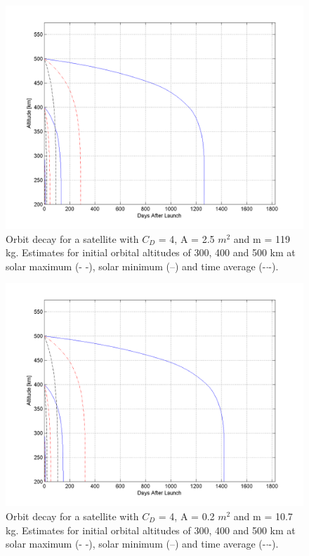 \begin{figure}[h!]
\centering
\includegraphics[width=0.95\textheight, angle=90]{chapters/img/orbitDecayEmitter.png}
\caption{Orbit decay for a satellite with $C_D$ = 4, A = 2.5 $m^2$ and m = 119 kg. Estimates for initial orbital altitudes of 300, 400 and 500 km at solar maximum (- -), solar minimum (--) and time average (-$\cdot$-).}
\label{fig:decayEmitter}
\end{figure}

\begin{figure}[h!]
\centering
\includegraphics[width=0.95\textheight, angle=90]{chapters/img/orbitDecayRecieverMin.png}
\caption{Orbit decay for a satellite with $C_D$ = 4, A = 0.2 $m^2$ and m = 10.7 kg. Estimates for initial orbital altitudes of 300, 400 and 500 km at solar maximum (- -), solar minimum (--) and time average (-$\cdot$-).}
\label{fig:decayReceiver}
\end{figure}

